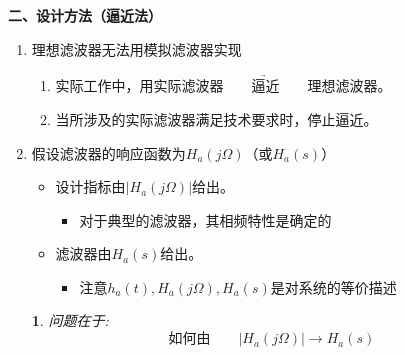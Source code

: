 \documentclass[notheorems,compress,mathserif,table]{beamer}
\newtheorem{dablock}{}
\begin{document}
\begin{frame}[shrink]\frametitle{}%

\textbf{二、设计方法（逼近法）}

\begin{enumerate}
      \item  [1]  理想滤波器无法用模拟滤波器实现
          \begin{enumerate}
            \item [(1)] 实际工作中，用实际滤波器$\quad\underrightarrow{\quad\mbox{逼近}
                \quad}\quad$理想滤波器。
            \item [(2)] 当所涉及的实际滤波器满足技术要求时，停止逼近。
          \end{enumerate}
          \par\quad%
      \item  [2]   假设滤波器的响应函数为$H_{a}(j\Omega)$\quad （或$H_{a}(s)$）
          \par
               \begin{itemize}
                 \item [(1)]设计指标由$|H_{a}(j\Omega)|$给出。
                     \begin{itemize}
                       \item 对于典型的滤波器，其相频特性是确定的
                     \end{itemize}

                 \item [(2)]滤波器由$H_{a}(s)$给出。
                     \begin{itemize}
                       \item 注意$h_a(t),H_a(j\Omega),H_a(s)$是对系统的等价描述
                     \end{itemize}
               \end{itemize}
\begin{dablock}
问题在于:
$$\mbox{如何由}\quad\quad \left|H_{a}(j\Omega)\right| \longrightarrow H_{a}(s)$$
\quad\newline\quad
\end{dablock}
\end{enumerate}
\end{frame}
\end{document}
